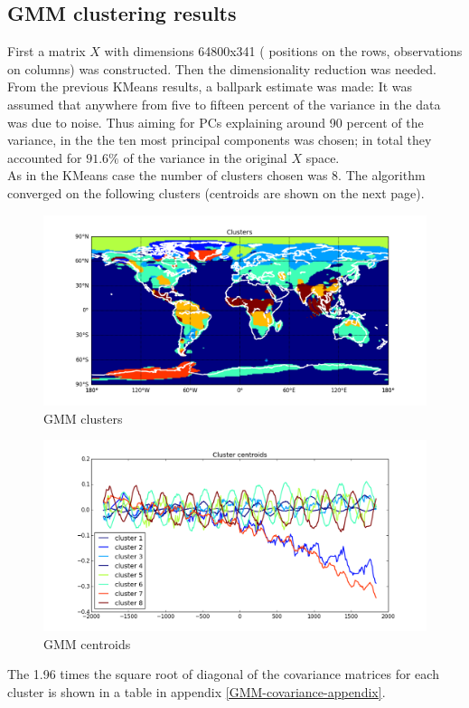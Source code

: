 \subsection{GMM clustering results}
First a matrix $X$ with dimensions 64800x341 ( positions on the rows, observations on columns) was constructed. Then the dimensionality reduction was needed. From the previous KMeans results, a ballpark estimate was made: It was assumed that anywhere from five to fifteen percent of the variance in the data was due to noise. Thus aiming for PCs explaining around 90 percent of the variance, in the the ten most principal components was chosen; in total they accounted for $91.6\%$ of the variance in the original $X$ space.
\\
As in the KMeans case the number of clusters chosen was 8. The algorithm converged on the following clusters (centroids are shown on the next page).
\begin{figure}[H]
	\center
	\includegraphics[width=\textwidth]{figures/gmm_world_8_clusters.png}
	\caption{GMM clusters}
\end{figure}
\begin{figure}[H]
	\center
	\includegraphics[width=\textwidth]{figures/gmm_8_clusters.png}
	\caption{GMM centroids}
\end{figure}
The 1.96 times the square root of diagonal of the covariance matrices for each cluster is shown in a table in appendix \ref{GMM-covariance-appendix}.